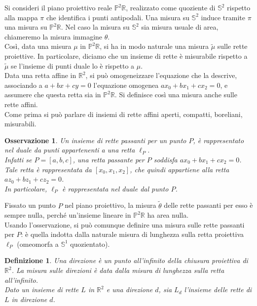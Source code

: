 \documentclass[a4paper, twoside,openright]{article}
\newcommand{\R}{\mathbb{R}}
\renewcommand{\P}{\mathbb{P}}
\renewcommand{\S}{\mathbb{S}}
\newcommand{\<}{\langle}
\renewcommand{\>}{\rangle}
\newtheorem{defin}[teo]{Definizione}
\newtheorem{oss}[teo]{Osservazione}
\begin{document}
Si consideri il piano proiettivo reale $\P^2 \R$, realizzato come quoziente di $\S^2$ rispetto alla mappa $\pi$ che identifica i punti antipodali. Una misura su $\S^2$ induce tramite $\pi$ una misura su $\P^2\R$. Nel caso la misura su $\S^2$ sia misura usuale di area, chiameremo la misura immagine $\theta$.\\
Così, data una misura $\mu$ in $\P^2 \R$, si ha in modo naturale una misura $\tilde \mu$ sulle rette proiettive. In particolare, diciamo che un insieme di rette è misurabile rispetto a $\tilde \mu$ se l'insieme di punti duale lo è rispetto a $\mu$.\\

Data una retta affine in $\R^2$, si può omogeneizzare l'equazione che la descrive, associando a $a+bx+cy=0$ l'equazione omogenea $ax_0+bx_1+cx_2=0$, e assumere che questa retta sia in $\P^2 \R$. Si definisce così una misura anche sulle rette affini.\\
Come prima si può parlare di insiemi di rette affini aperti, compatti, boreliani, misurabili.

\begin{oss}
	\label{osservazione}
	Un insieme di rette passanti per un punto $P$, è rappresentato nel duale da punti appartenenti a una retta $\ell_P$.\\
	Infatti se $P=[a,b,c]$, una retta passante per $P$ soddisfa $ax_0+bx_1+cx_2=0$. Tale retta è rappresentata da $[x_0,x_1,x_2]$, che quindi appartiene alla retta $az_0+bz_1+cz_2=0$.\\
	In particolare, $\ell_P$ è rappresentata nel duale dal punto $P$.
\end{oss}

Fissato un punto $P$ nel piano proiettivo, la misura $\tilde \theta$ delle rette passanti per esso è sempre nulla, perché un'insieme lineare in $\P^2 \R$ ha area nulla.\\
Usando l'osservazione, si può comunque definire una misura sulle rette passanti per $P$: è quella indotta dalla naturale misura di lunghezza sulla retta proiettiva $\ell_P$ (omeomorfa a $\S^1$ quozientato).

\begin{defin}
Una direzione è un punto all'infinito della chiusura proiettiva di $\R^2$. La misura sulle direzioni è data dalla misura di lunghezza sulla retta all'infinito.\\
Dato un insieme di rette $L$ in $\R^2$ e una direzione $d$, sia $L_{d}$ l'insieme delle rette di $L$ in direzione $d$.
\end{defin}
\end{document}
